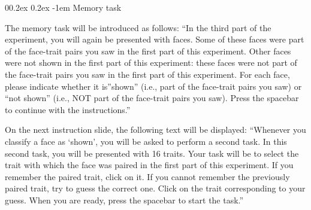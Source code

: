 \documentclass[
  doc,floatsintext]{apa6}
\makeatletter
\let\oldparagraph\paragraph
\renewcommand{\paragraph}{
    \@ifstar
      \xxxParagraphStar
      \xxxParagraphNoStar
  }
\newcommand{\xxxParagraphStar}[1]{\oldparagraph*{#1}\mbox{}}
\newcommand{\xxxParagraphNoStar}[1]{\oldparagraph{#1}\mbox{}}
\renewcommand{\paragraph}{\@startsection{paragraph}{4}{\parindent}%
  {0\baselineskip \@plus 0.2ex \@minus 0.2ex}%
  {-1em}%
  {\normalfont\normalsize\bfseries\itshape\typesectitle}}
\makeatother
\begin{document}
\paragraph{Memory task}\label{memory-task}

The memory task will be introduced as follows:
``In the third part of the experiment, you will again be presented with faces.
Some of these faces were part of the face-trait pairs you saw in the first part of this experiment.
Other faces were not shown in the first part of this experiment: these faces were not part of the face-trait pairs you saw in the first part of this experiment.
For each face, please indicate whether it is''shown'' (i.e., part of the face-trait pairs you saw) or
``not shown'' (i.e., NOT part of the face-trait pairs you saw).
Press the spacebar to continue with the instructions.''

On the next instruction slide, the following text will be displayed:
``Whenever you classify a face as `shown', you will be asked to perform a second task.
In this second task, you will be presented with 16 traits.
Your task will be to select the trait with which the face was paired in the first part of this experiment.
If you remember the paired trait, click on it.
If you cannot remember the previously paired trait, try to guess the correct one.
Click on the trait corresponding to your guess.
When you are ready, press the spacebar to start the task.''
\end{document}
